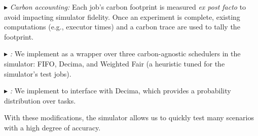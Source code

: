 \noindent$\blacktriangleright$ \textit{Carbon accounting: } Each job's carbon footprint is measured \textit{ex post facto} to avoid impacting simulator fidelity.  Once an experiment is complete, existing computations (e.g., executor times) and a carbon trace are used to tally the footprint.

\noindent$\blacktriangleright$ \textit{\CAP: } We implement \CAP as a wrapper over three carbon-agnostic schedulers in the simulator: FIFO, Decima, and Weighted Fair (a heuristic tuned for the simulator's test jobs).

\noindent$\blacktriangleright$ \textit{\DANISH: } We implement \DANISH to interface with Decima, which provides a probability distribution over tasks.


\noindent With these modifications, the simulator allows us to quickly test many scenarios with a high degree of accuracy.
\vspace{-0.5em}

